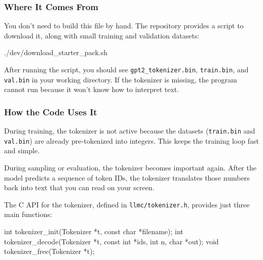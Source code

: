 \documentclass[
  letterpaper,
  DIV=11,
  numbers=noendperiod]{scrreprt}
\newenvironment{Shaded}{\begin{snugshade}}{\end{snugshade}}
\newcommand{\DataTypeTok}[1]{\textcolor[rgb]{0.68,0.00,0.00}{#1}}
\newcommand{\ExtensionTok}[1]{\textcolor[rgb]{0.00,0.23,0.31}{#1}}
\newcommand{\NormalTok}[1]{\textcolor[rgb]{0.00,0.23,0.31}{#1}}
\newcommand{\OperatorTok}[1]{\textcolor[rgb]{0.37,0.37,0.37}{#1}}
\begin{document}
\subsubsection{Where It Comes From}\label{where-it-comes-from}

You don't need to build this file by hand. The repository provides a
script to download it, along with small training and validation
datasets:

\begin{Shaded}
\begin{Highlighting}[]
\ExtensionTok{./dev/download\_starter\_pack.sh}
\end{Highlighting}
\end{Shaded}

After running the script, you should see \texttt{gpt2\_tokenizer.bin},
\texttt{train.bin}, and \texttt{val.bin} in your working directory. If
the tokenizer is missing, the program cannot run because it won't know
how to interpret text.

\subsubsection{How the Code Uses It}\label{how-the-code-uses-it}

During training, the tokenizer is not active because the datasets
(\texttt{train.bin} and \texttt{val.bin}) are already pre-tokenized into
integers. This keeps the training loop fast and simple.

During sampling or evaluation, the tokenizer becomes important again.
After the model predicts a sequence of token IDs, the tokenizer
translates those numbers back into text that you can read on your
screen.

The C API for the tokenizer, defined in \texttt{llmc/tokenizer.h},
provides just three main functions:

\begin{Shaded}
\begin{Highlighting}[]
\DataTypeTok{int}\NormalTok{ tokenizer\_init}\OperatorTok{(}\NormalTok{Tokenizer }\OperatorTok{*}\NormalTok{t}\OperatorTok{,} \DataTypeTok{const} \DataTypeTok{char} \OperatorTok{*}\NormalTok{filename}\OperatorTok{);}
\DataTypeTok{int}\NormalTok{ tokenizer\_decode}\OperatorTok{(}\NormalTok{Tokenizer }\OperatorTok{*}\NormalTok{t}\OperatorTok{,} \DataTypeTok{const} \DataTypeTok{int} \OperatorTok{*}\NormalTok{ids}\OperatorTok{,} \DataTypeTok{int}\NormalTok{ n}\OperatorTok{,} \DataTypeTok{char} \OperatorTok{*}\NormalTok{out}\OperatorTok{);}
\DataTypeTok{void}\NormalTok{ tokenizer\_free}\OperatorTok{(}\NormalTok{Tokenizer }\OperatorTok{*}\NormalTok{t}\OperatorTok{);}
\end{Highlighting}
\end{Shaded}
\end{document}
